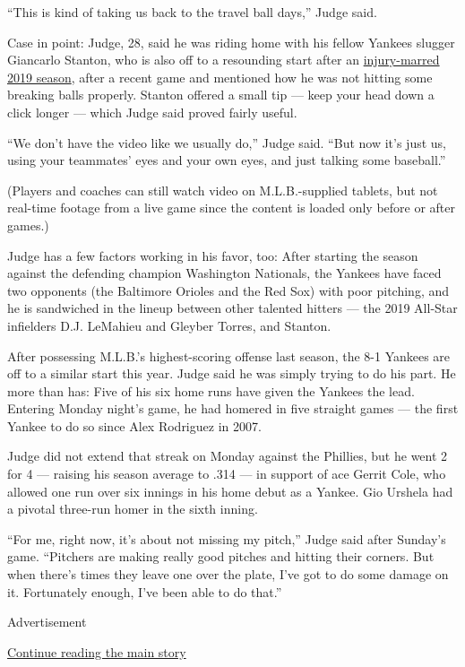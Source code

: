 ``This is kind of taking us back to the travel ball days,'' Judge said.

Case in point: Judge, 28, said he was riding home with his fellow
Yankees slugger Giancarlo Stanton, who is also off to a resounding start
after an
\href{https://www.nytimes.com/2019/09/18/sports/baseball/giancarlo-stanton-yankees.html}{injury-marred
2019 season}, after a recent game and mentioned how he was not hitting
some breaking balls properly. Stanton offered a small tip --- keep your
head down a click longer --- which Judge said proved fairly useful.

``We don't have the video like we usually do,'' Judge said. ``But now
it's just us, using your teammates' eyes and your own eyes, and just
talking some baseball.''

(Players and coaches can still watch video on M.L.B.-supplied tablets,
but not real-time footage from a live game since the content is loaded
only before or after games.)

Judge has a few factors working in his favor, too: After starting the
season against the defending champion Washington Nationals, the Yankees
have faced two opponents (the Baltimore Orioles and the Red Sox) with
poor pitching, and he is sandwiched in the lineup between other talented
hitters --- the 2019 All-Star infielders D.J. LeMahieu and Gleyber
Torres, and Stanton.

After possessing M.L.B.'s highest-scoring offense last season, the 8-1
Yankees are off to a similar start this year. Judge said he was simply
trying to do his part. He more than has: Five of his six home runs have
given the Yankees the lead. Entering Monday night's game, he had homered
in five straight games --- the first Yankee to do so since Alex
Rodriguez in 2007.

Judge did not extend that streak on Monday against the Phillies, but he
went 2 for 4 --- raising his season average to .314 --- in support of
ace Gerrit Cole, who allowed one run over six innings in his home debut
as a Yankee. Gio Urshela had a pivotal three-run homer in the sixth
inning.

``For me, right now, it's about not missing my pitch,'' Judge said after
Sunday's game. ``Pitchers are making really good pitches and hitting
their corners. But when there's times they leave one over the plate,
I've got to do some damage on it. Fortunately enough, I've been able to
do that.''

Advertisement

\protect\hyperlink{after-bottom}{Continue reading the main story}

